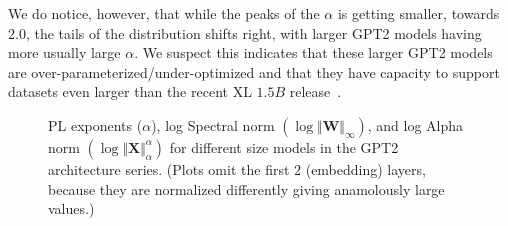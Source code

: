 We do notice, however, that while the peaks of the $\alpha$ is getting smaller, 
towards $2.0$,
the tails of the distribution shifts right, with larger GPT2 models having more
usually large $\alpha$.  
We suspect this indicates that these larger GPT2 models are over-parameterized/under-optimized and 
that they have capacity to support datasets even larger than the recent XL $1.5B$ release~\cite{gpt2-xl}.

\begin{figure}[htb]
    \centering

    \caption{PL exponents ($\alpha$), log Spectral norm $(\log\Vert\mathbf{W}\Vert_{\infty})$, and log Alpha norm $(\log\Vert\mathbf{X}\Vert_{\alpha}^{\alpha})$ for different size models in the GPT2 architecture series.  (Plots omit the first 2 (embedding) layers, because they are normalized differently giving anamolously large values.)}
    \label{fig:gpt2-histograms}
\end{figure}
